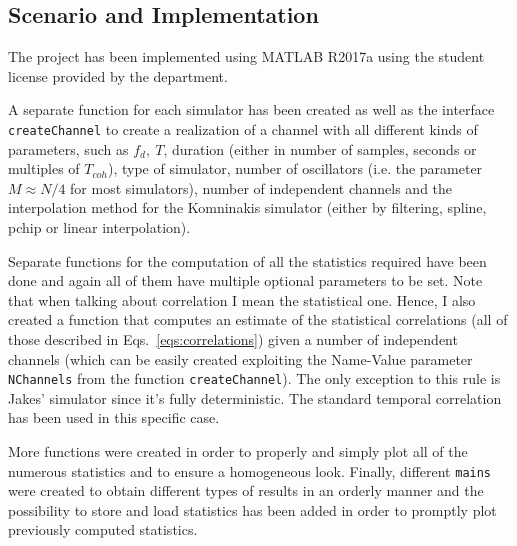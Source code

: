\subsection{Scenario and Implementation} %
\label{subsec:scenario}

The project has been implemented using MATLAB\textsuperscript{\textregistered} R2017a using the student license provided by the department.

A separate function for each simulator has been created as well as the interface \texttt{createChannel} to create a realization of a channel with all different kinds of parameters, such as $f_d,\ T$, duration (either in number of samples, seconds or multiples of $T_{coh}$), type of simulator, number of oscillators (i.e. the parameter $M \approx N/4$ for most simulators), number of independent channels and the interpolation method for the Komninakis simulator (either by filtering, spline, pchip or linear interpolation).

Separate functions for the computation of all the statistics required have been done and again all of them have multiple optional parameters to be set. Note that when talking about correlation I mean the statistical one. Hence, I also created a function that computes an estimate of the statistical correlations (all of those described in Eqs.~\ref{eqs:correlations}) given a number of independent channels (which can be easily created exploiting the Name-Value parameter \texttt{NChannels} from the function \texttt{createChannel}). The only exception to this rule is Jakes' simulator since it's fully deterministic. The standard temporal correlation has been used in this specific case.

More functions were created in order to properly and simply plot all of the numerous statistics and to ensure a homogeneous look. Finally, different \texttt{mains} were created to obtain different types of results in an orderly manner and the possibility to store and load statistics has been added in order to promptly plot previously computed statistics.